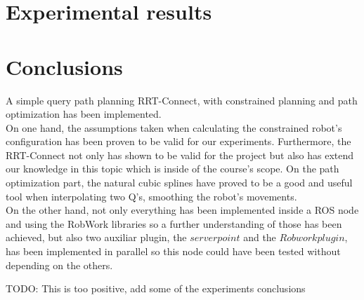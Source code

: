 
\section{Experimental results} %
\label{sec:experimental_results_pathplanning}


\section{Conclusions} %
\label{sec:conclusions_pathplanning}
A simple query path planning RRT-Connect, with constrained planning and path optimization has been implemented. \\

On one hand, the assumptions taken when calculating the constrained robot's configuration has been proven to be valid for our experiments. 
Furthermore, the RRT-Connect not only has shown to be valid for the project but also has extend our knowledge in this topic which is inside of the course's scope.
On the path optimization part, the natural cubic splines have proved to be a good and useful tool when interpolating two Q's, smoothing the robot's movements. \\

On the other hand, not only everything has been implemented inside a ROS node and using the RobWork libraries so a further understanding of those has been achieved, but also two auxiliar plugin, the $server point$ and the $Robwork plugin$, has been implemented in parallel so this node could have been tested without depending on the others.

TODO: This is too positive, add some of the experiments conclusions

